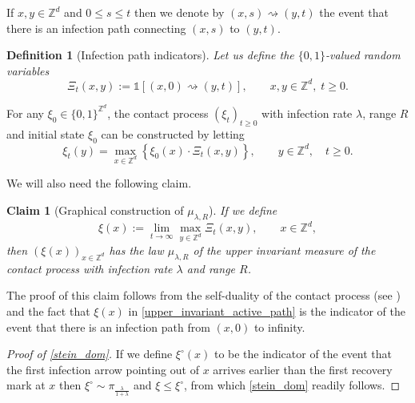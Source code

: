 \documentclass[a4paper,12pt]{article}
\newtheorem  {definition}    [theorem]{Definition}
\newtheorem  {claim}        [theorem]{Claim}
\newcommand{\Z}{\mathbb{Z}}
\begin{document}
 If $x,y \in \mathbb{Z}^d$ and $0\leq s \leq t$ then we denote by $(x,s)\rightsquigarrow (y,t)$
the event that there is an infection path connecting $(x,s)$ to $(y,t)$.

\begin{definition}[Infection path indicators]\label{Xi_graph_def}
  Let us define the  $\{0,1 \}$-valued random variables
\begin{equation}\label{Xi_graphical_def_eq}
 \Xi_t(x,y) := \mathds{1}\left[(x,0)\rightsquigarrow (y,t) \right],\qquad x, y \in \Z^d,\; t \ge 0.
 \end{equation}
 \end{definition}
 For any  $\xi_0 \in \{0,1\}^{\mathbb{Z}^d}$, the contact process $(\xi_t)_{t \geq 0}$ with infection rate $\lambda$, range $R$ and initial  state $\xi_0$ can be constructed by letting
\begin{equation}
\xi_t(y)= \max_{x \in \mathbb{Z}^d} \left\{ \xi_0(x) \cdot \Xi_t(x,y) \right\} , \qquad y \in \mathbb{Z}^d, \quad t \geq 0.
\end{equation}

We will also need the following claim.

\begin{claim}[Graphical construction of $\mu_{\lambda,R}$] \label{claim_graphical_upper_invariant}
 If we define
\begin{equation}\label{upper_invariant_active_path}
  \xi(x):=  \lim_{t \to \infty} \max_{y \in \mathbb{Z}^d} \Xi_t(x,y) , \qquad x \in \mathbb{Z}^d,
\end{equation}
then $(\xi(x))_{x \in \mathbb{Z}^d}$ has the law $\mu_{\lambda,R}$ of the upper invariant measure of the contact process with infection rate $\lambda$ and range $R$.
\end{claim}
The proof of this claim follows from the self-duality of the contact process (see \cite[Part I., Section 1.]{Li99})
and the fact that $\xi(x)$ in \eqref{upper_invariant_active_path}  is the indicator of the event that there is an infection path from $(x,0)$ to infinity.



\begin{proof}[Proof of \eqref{stein_dom}]
If we define $\xi^\circ(x)$ to be the indicator of the event that the first infection arrow pointing out of $x$ arrives earlier than the first recovery mark at $x$ then
$\xi^\circ \sim \pi_{\frac{\lambda}{1+\lambda}}$ and $\xi \leq \xi^{\circ}$, from which
 \eqref{stein_dom} readily follows.
\end{proof}
\end{document}
